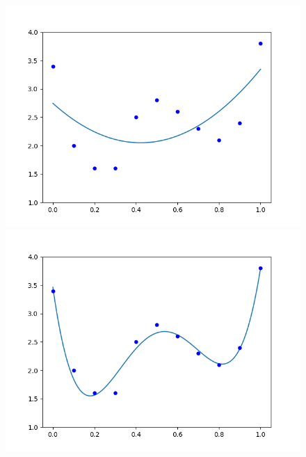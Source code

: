 \documentclass[a4paper,11pt]{jsreport}
\begin{document}
\begin{figure}[H]
  \begin{minipage}[b]{0.3\linewidth}
    \centering
    \includegraphics[keepaspectratio, scale=0.3]{image/多項式回帰(a).png}
  \end{minipage}
  \begin{minipage}[b]{0.3\linewidth}
    \centering
    \includegraphics[keepaspectratio, scale=0.3]{image/多項式回帰(b).png}
  \end{minipage}
  \begin{minipage}[b]{0.3\linewidth}
    \centering

\end{minipage}
\end{figure}
\end{document}
